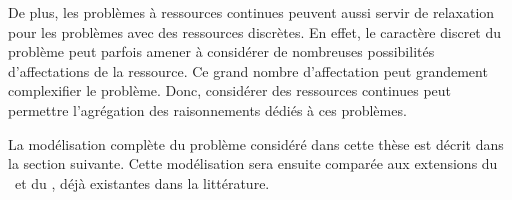 De plus, les problèmes à ressources continues peuvent aussi servir de
relaxation pour les problèmes avec des ressources discrètes. En effet,
le caractère discret du problème peut parfois amener à considérer de
nombreuses possibilités d'affectations de la ressource. Ce grand nombre
d'affectation peut grandement complexifier le problème. Donc,
considérer des ressources continues peut permettre l'agrégation des
raisonnements dédiés à ces problèmes. 

La modélisation complète du problème considéré dans cette thèse est
décrit dans la section suivante. Cette modélisation sera ensuite
comparée aux extensions du \CUSP~et du \RCPSP, déjà existantes dans la
littérature. 


